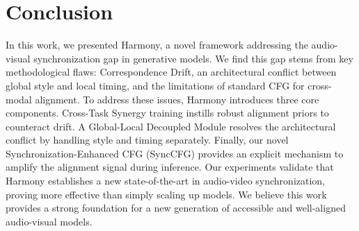 \section{Conclusion}
\label{sec:conclusion}

In this work, we presented Harmony, a novel framework addressing the audio-visual synchronization gap in generative models. We find this gap stems from key methodological flaws: Correspondence Drift, an architectural conflict between global style and local timing, and the limitations of standard CFG for cross-modal alignment.
To address these issues, Harmony introduces three core components. Cross-Task Synergy training instills robust alignment priors to counteract drift. A Global-Local Decoupled Module resolves the architectural conflict by handling style and timing separately. Finally, our novel Synchronization-Enhanced CFG (SyncCFG) provides an explicit mechanism to amplify the alignment signal during inference.
Our experiments validate that Harmony establishes a new state-of-the-art in audio-video synchronization, proving more effective than simply scaling up models. We believe this work provides a strong foundation for a new generation of accessible and well-aligned audio-visual models.

